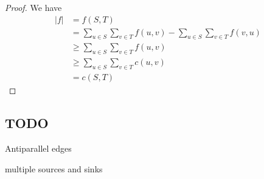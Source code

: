 \begin{proof}
  We have
  \begin{align*}
    |f| &= f(S,T) \\
        &= \sum_{u \in S} \sum_{v \in T} f(u,v) - \sum_{u \in S} \sum_{v \in T} f(v,u) \\
        &\geq \sum_{u \in S} \sum_{v \in T} f(u,v) \\
        &\geq \sum_{u \in S} \sum_{v \in T} c(u,v) \\
        &= c(S,T)
  \end{align*}
  
\end{proof}


\subsection{TODO}

Antiparallel edges

multiple sources and sinks


